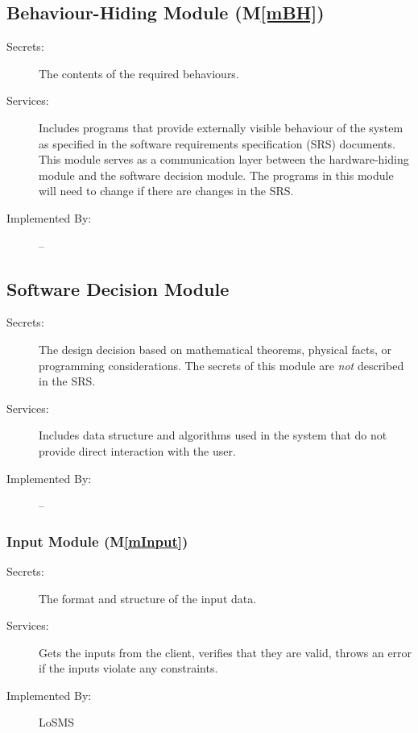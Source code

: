 \documentclass[12pt, titlepage]{article}
\newcommand{\mref}[1]{M\ref{#1}}
\newcommand{\famname}{LoSMS} %
\begin{document}
\subsection{Behaviour-Hiding Module (\mref{mBH})}

\begin{description}
\item[Secrets:]The contents of the required behaviours.
\item[Services:]Includes programs that provide externally visible behaviour of
  the system as specified in the software requirements specification (SRS)
  documents. This module serves as a communication layer between the
  hardware-hiding module and the software decision module. The programs in this
  module will need to change if there are changes in the SRS.
\item[Implemented By:] --
\end{description}

\subsection{Software Decision Module}

\begin{description}
\item[Secrets:] The design decision based on mathematical theorems, physical
  facts, or programming considerations. The secrets of this module are
  \emph{not} described in the SRS.
\item[Services:] Includes data structure and algorithms used in the system that
  do not provide direct interaction with the user. 
\item[Implemented By:] --
\end{description}

\subsubsection{Input Module (\mref{mInput})}

\begin{description}
	\item[Secrets:]The format and structure of the input data.
	\item[Services:]Gets the inputs from the client, verifies that they are 
	valid, 
	throws an error if the inputs violate any constraints.
	\item[Implemented By:] \famname{}
\end{description}
\end{document}
